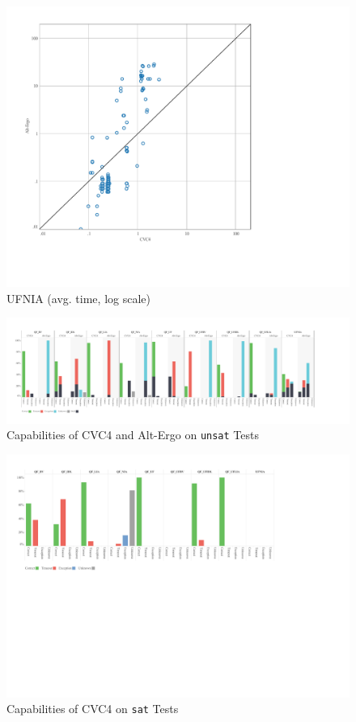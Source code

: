 \documentclass[10pt,letter]{article}
\theoremstyle{definition}
\begin{document}
\begin{figure}
\centering
\includegraphics[scale=0.42,trim=0.5cm 0.2cm 0 0, clip=true]{./testanalysis/ScatterUFNIA.pdf}
\caption{UFNIA (avg. time, log scale)}
\label{f:ufnia}
\end{figure}

\onecolumn


\twocolumn
\begin{figure}
\centering
\includegraphics[scale=0.45]{./testanalysis/unsatcap.pdf}
\caption{Capabilities of CVC4 and Alt-Ergo on {\tt unsat} Tests}
\label{f:unsatcap}
\end{figure}


\begin{figure}
\centering
\includegraphics[scale=0.45]{./testanalysis/satcap.pdf}
\caption{Capabilities of CVC4 on {\tt sat} Tests}
\label{f:satcap}
\end{figure}

\onecolumn








\end{document}
